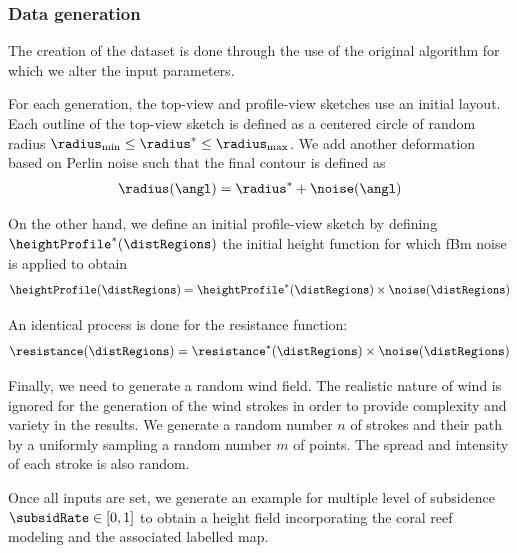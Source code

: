 \subsubsection{Data generation}


The creation of the dataset is done through the use of the original algorithm for which we alter the input parameters. 

For each generation, the top-view and profile-view sketches use an initial layout. Each outline of the top-view sketch is defined as a centered circle of random radius $\radius_\text{min} \leq \radius^* \leq \radius_\text{max}$. We add another deformation based on Perlin noise such that the final contour is defined as 
\begin{align}
    \radius(\angl) = \radius^* + \noise(\angl)
\end{align}

On the other hand, we define an initial profile-view sketch by defining $\heightProfile^*(\distRegions)$ the initial height function for which fBm noise is applied to obtain 
\begin{align}
    \heightProfile(\distRegions) = \heightProfile^*(\distRegions) \times \noise(\distRegions)
\end{align}

An identical process is done for the resistance function:
\begin{align}
    \resistance(\distRegions) = \resistance^*(\distRegions) \times \noise(\distRegions)
\end{align}

Finally, we need to generate a random wind field. The realistic nature of wind is ignored for the generation of the wind strokes in order to provide complexity and variety in the results. 
We generate a random number $n$ of strokes and their path by a uniformly sampling a random number $m$ of points. The spread and intensity of each stroke is also random.

Once all inputs are set, we generate an example for multiple level of subsidence $\subsidRate \in [0, 1]$ to obtain a height field incorporating the coral reef modeling and the associated labelled map. 

